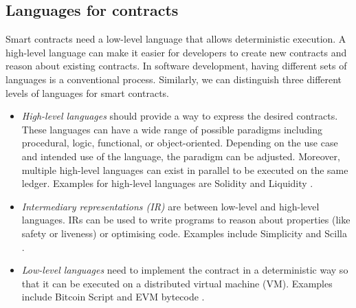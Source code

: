 \documentclass{llncs}
\begin{document}

\subsection{Languages for contracts}

Smart contracts need a low-level language that allows deterministic execution. 
A high-level language can make it easier for developers to create new contracts and reason about existing contracts.
In software development, having different sets of languages is a conventional process.
Similarly, we can distinguish three different levels of languages for smart contracts.

\begin{itemize}
\item \emph{High-level languages} should provide a way to express the desired contracts. These languages can have a wide range of possible paradigms including procedural, logic, functional, or object-oriented. Depending on the use case and intended use of the language, the paradigm can be adjusted. Moreover, multiple high-level languages can exist in parallel to be executed on the same ledger. Examples for high-level languages are Solidity \cite{Ethereum2018Solidity} and Liquidity \cite{OCamlProSAS2018}.
\item \emph{Intermediary representations (IR)} are between low-level and high-level languages. IRs can be used to write programs to reason about properties (like safety or liveness) or optimising code. Examples include Simplicity \cite{OConnor2017} and Scilla \cite{Sergey2018}.
\item \emph{Low-level languages} need to implement the contract in a deterministic way so that it can be executed on a distributed virtual machine (VM). Examples include Bitcoin Script \cite{BitcoinWiki2018Script} and EVM bytecode \cite{Wood2014}.
\end{itemize}
\end{document}
